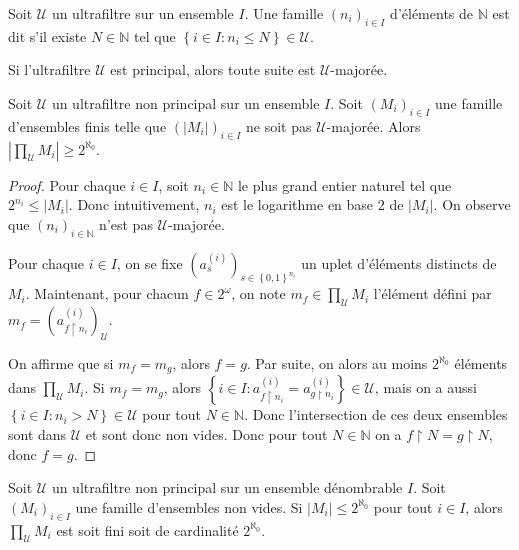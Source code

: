 \begin{definition}
	Soit $\mathcal{U}$ un ultrafiltre sur un ensemble $I$. Une famille $\left(n_{i}\right)_{i\in I}$ d'éléments de $\mathbb{N}$ est dit  s'il existe $N\in\mathbb{N}$ tel que $\left\{i\in I:n_{i}\leq N\right\}\in\mathcal{U}$.
\end{definition}

\begin{remark}
	Si l'ultrafiltre $\mathcal{U}$ est principal, alors toute suite est $\mathcal{U}$-majorée.
\end{remark}

\begin{lemma}
	Soit $\mathcal{U}$ un ultrafiltre non principal sur un ensemble $I$. Soit $\left(M_{i}\right)_{i\in I}$ une famille d'ensembles finis telle que $\left(\left\lvert M_{i}\right\rvert\right)_{i\in I}$ ne soit pas $\mathcal{U}$-majorée. Alors $\left\lvert\prod_{\mathcal{U}}M_{i}\right\rvert\geq 2^{\aleph_{0}}$.
\end{lemma}

\begin{proof}
	Pour chaque $i\in I$, soit $n_{i}\in\mathbb{N}$ le plus grand entier naturel tel que $2^{n_{i}}\leq\left\lvert M_{i}\right\rvert$. Donc intuitivement, $n_{i}$ est le logarithme en base $2$ de $\left\lvert M_{i}\right\rvert$. On observe que $\left(n_{i}\right)_{i\in\mathbb{N}}$ n'est pas $\mathcal{U}$-majorée.
	
	Pour chaque $i\in I$, on se fixe $\left(a_{s}^{\left(i\right)}\right)_{s\in\left\{0,1\right\}^{n_{i}}}$ un uplet d'éléments distincts de $M_{i}$. Maintenant, pour chacun $f\in 2^{\omega}$, on note $m_{f}\in\prod_{\mathcal{U}}M_{i}$ l'élément défini par $m_{f}=\left(a_{f\upharpoonright n_{i}}^{\left(i\right)}\right)_{\mathcal{U}}$.
	
	On affirme que si $m_{f}=m_{g}$, alors $f=g$. Par suite, on alors au moins $2^{\aleph_{0}}$ éléments dans $\prod_{\mathcal{U}}M_{i}$. Si $m_{f}=m_{g}$, alors $\left\{i\in I:a_{f\upharpoonright n_{i}}^{\left(i\right)}=a_{g\upharpoonright n_{i}}^{\left(i\right)}\right\}\in\mathcal{U}$, mais on a aussi $\left\{i\in I:n_{i}>N\right\}\in\mathcal{U}$ pour tout $N\in\mathbb{N}$. Donc l'intersection de ces deux ensembles sont dans $\mathcal{U}$ et sont donc non vides. Donc pour tout $N\in\mathbb{N}$ on a $f\upharpoonright N=g\upharpoonright N$, donc $f=g$.
\end{proof}

\begin{proposition}
	Soit $\mathcal{U}$ un ultrafiltre non principal sur un ensemble dénombrable $I$. Soit $\left(M_{i}\right)_{i\in I}$ une famille d'ensembles non vides. Si $\left\lvert M_{i}\right\rvert\leq 2^{\aleph_{0}}$ pour tout $i\in I$, alors $\prod_{\mathcal{U}}M_{i}$ est soit fini soit de cardinalité $2^{\aleph_{0}}$.
\end{proposition}

